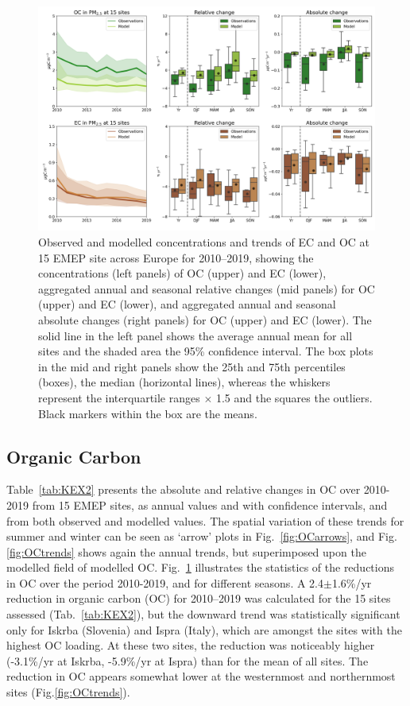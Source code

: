 \begin{figure}[t]
\includegraphics[width=16cm]{FIGS_TRENDS/ECOC_trends.png}
\caption{Observed and modelled concentrations and trends of EC and OC at 15 EMEP
  site across Europe for 2010--2019, showing the concentrations
  (left panels) of OC (upper) and EC (lower), aggregated annual and
  seasonal relative changes (mid panels) for OC (upper) and EC (lower),
  and aggregated annual and seasonal absolute changes (right panels)
  for OC (upper) and EC (lower). The solid line in the left panel shows
  the average annual mean for all sites and the shaded area the 95\%
  confidence interval. The box plots in the mid and right panels show
  the 25th and 75th percentiles (boxes), the median (horizontal lines),
  whereas the whiskers represent the interquartile ranges $\times$
  1.5 and the squares the outliers. Black markers within the box are
  the means.\label{fig:KEX1}
}
\end{figure}







\subsection{Organic Carbon}
\label{ss:trendsOC}
 
 Table~\ref{tab:KEX2} presents the absolute and relative changes in OC over 2010-2019 from 15 EMEP sites, as annual values and with confidence intervals, and from both observed and modelled values. The spatial variation of these trends for summer and winter can be seen as `arrow' plots in Fig.~\ref{fig:OCarrows}, and Fig.\ref{fig:OCtrends} shows again the annual trends, but superimposed upon the modelled field of modelled OC.
Fig.~\ref{fig:KEX1} illustrates the statistics of the reductions in OC  over the period 2010-2019, and for different seasons. 
A 2.4$\pm$1.6\%/yr reduction
  in organic carbon (OC) for 2010--2019
was calculated for the 15 sites assessed (Tab.~\ref{tab:KEX2}), but the
downward trend was statistically significant only for Iskrba (Slovenia)
and Ispra (Italy), which are amongst the sites with the highest OC
loading. At these two sites, the reduction was noticeably higher 
(-3.1\%/yr at Iskrba, -5.9\%/yr at Ispra) than for the mean of all sites. The
reduction in OC appears somewhat lower at the westernmost and northernmost
sites (Fig.\ref{fig:OCtrends}). 


